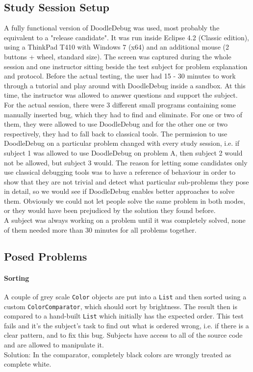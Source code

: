 \documentclass[english]{acm_proc_article-sp}
\begin{document}
\subsection{Study Session Setup}
A fully functional version of DoodleDebug was used, most probably the equivalent to a "release candidate". It was run inside Eclipse 4.2 (Classic edition), using a ThinkPad T410 with Windows 7 (x64) and an additional mouse (2 buttons + wheel, standard size). The screen was captured during the whole session and one instructor sitting beside the test subject for problem explanation and protocol. Before the actual testing, the user had 15 - 30 minutes to work through a tutorial and play around with DoodleDebug inside a sandbox. At this time, the instructor was allowed to answer questions and support the subject.\\
For the actual session, there were 3 different small programs containing some manually inserted bug, which they had to find and eliminate. For one or two of them, they were allowed to use DoodleDebug and for the other one or two respectively, they had to fall back to classical tools. The permission to use DoodleDebug on a particular problem changed with every study session, i.e. if subject 1 was allowed to use DoodleDebug on problem A, then subject 2 would not be allowed, but subject 3 would. The reason for letting some candidates only use classical debugging tools was to have a reference of behaviour in order to show that they are not trivial and detect what particular sub-problems they pose in detail, so we would see if DoodleDebug enables better approaches to solve them. Obviously we could not let people solve the same problem in both modes, or they would have been prejudiced by the solution they found before.\\
A subject was always working on a problem until it was completely solved, none of them needed more than 30 minutes for all problems together.

\subsection{Posed Problems}
\paragraph{Sorting}
A couple of grey scale \verb.Color. objects are put into a \verb.List. and then sorted using a custom \verb.ColorComparator., which should sort by brightness. The result then is compared to a hand-built \verb.List. which initially has the expected order. This test fails and it's the subject's task to find out what is ordered wrong, i.e. if there is a clear pattern, and to fix this bug. Subjects have access to all of the source code and are allowed to manipulate it.\\
Solution: In the comparator, completely black colors are wrongly treated as complete white.
\end{document}
